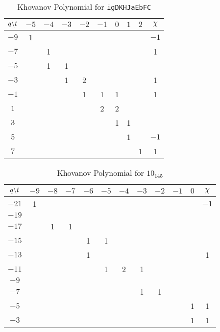     \begin{table}
        \centering
        \begin{tabular}{| c | c | c | c | c | c | c | c | c | c |}
            \hline
            $q\symbol{92}t$&$-5$&$-4$&$-3$&$-2$&$-1$&$0$&$1$&$2$&$\chi$\\
            \hline
            $-9$&1&&&&&&&&$-1$\\
            \hline
            $-7$&&1&&&&&&&1\\
            \hline
            $-5$&&1&1&&&&&&\\
            \hline
            $-3$&&&1&2&&&&&1\\
            \hline
            $-1$&&&&1&1&1&&&1\\
            \hline
            $1$&&&&&2&2&&&\\
            \hline
            $3$&&&&&&1&1&&\\
            \hline
            $5$&&&&&&&1&&$-1$\\
            \hline
            $7$&&&&&&&&1&1\\
            \hline
        \end{tabular}
        \caption{Khovanov Polynomial for \texttt{igDKHJaEbFC}}
    \end{table}
    \begin{table}
        \centering
        \begin{tabular}{| c | c | c | c | c | c | c | c | c | c | c | c |}
            \hline
            $q\symbol{92}t$&$-9$&$-8$&$-7$&$-6$&$-5$&$-4$&$-3$&$-2$&$-1$&$0$&$\chi$\\
            \hline
            $-21$&1&&&&&&&&&&$-1$\\
            \hline
            $-19$&&&&&&&&&&&\\
            \hline
            $-17$&&1&1&&&&&&&&\\
            \hline
            $-15$&&&&1&1&&&&&&\\
            \hline
            $-13$&&&&1&&&&&&&1\\
            \hline
            $-11$&&&&&1&2&1&&&&\\
            \hline
            $-9$&&&&&&&&&&&\\
            \hline
            $-7$&&&&&&&1&1&&&\\
            \hline
            $-5$&&&&&&&&&&1&1\\
            \hline
            $-3$&&&&&&&&&&1&1\\
            \hline
        \end{tabular}
        \caption{Khovanov Polynomial for $10_{145}$}
    \end{table}
